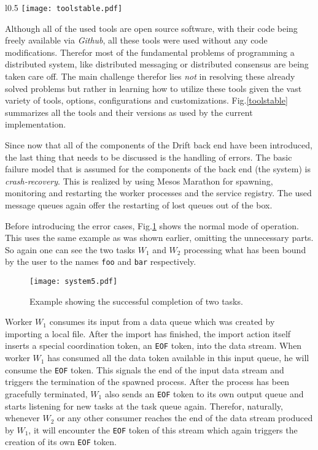 \begin{wrapfigure}{l}{0.5\textwidth}
  \texttt{[image: toolstable.pdf]}
  \caption{Overview over the tools and their versions as used
           in the current implementation.}
  \label{toolstable}
  \vspace{-10pt}
\end{wrapfigure}

Although all of the used tools are open source software, with their
code being freely available via \textit{Github}, all these tools were
used without any code modifications. Therefor most of the fundamental
problems of programming a distributed system, like distributed
messaging or distributed consensus are being taken care off.
The main challenge therefor lies \textit{not} in resolving these
already solved problems but rather in learning how to utilize
these tools given the vast variety of tools, options, configurations
and customizations.
Fig.\ref{toolstable} summarizes all the tools and their versions
as used by the current implementation.
\newline

Since now that all of the components of the Drift back end have
been introduced, the last thing that needs to be discussed is
the handling of errors. The basic failure model that is assumed
for the components of the back end (the system) is
\textit{crash-recovery}. This is realized by using Mesos Marathon
for spawning, monitoring and restarting the worker processes and
the service registry. The used message queues again offer the
restarting of lost queues out of the box.

Before introducing the error cases, Fig.\ref{system5} shows
the normal mode of operation. This uses the same example as
was shown earlier, omitting the unnecessary parts. So again
one can see the two tasks $W_{1}$ and $W_{2}$ processing
what has been bound by the user to the names \texttt{foo} and
\texttt{bar} respectively.

\begin{figure}[h]
  \texttt{[image: system5.pdf]}
  \caption{Example showing the successful completion of two
           tasks.}
  \label{system5}
\end{figure}

Worker $W_{1}$ consumes its input from a data queue which was
created by importing a local file. After the import has finished,
the import action itself inserts a special coordination token,
an \texttt{EOF} token, into the data stream. When worker
$W_{1}$ has consumed all the data token available in this
input queue, he will consume the \texttt{EOF} token. This
signals the end of the input data stream and triggers the
termination of the spawned process. After the process has
been gracefully terminated, $W_{1}$ also sends an \texttt{EOF}
token to its own output queue and starts listening for new
tasks at the task queue again. Therefor, naturally, whenever
$W_{2}$ or any other consumer reaches the end of the data
stream produced by $W_{1}$, it will encounter the \texttt{EOF}
token of this stream which again triggers the creation
of its own \texttt{EOF} token.

